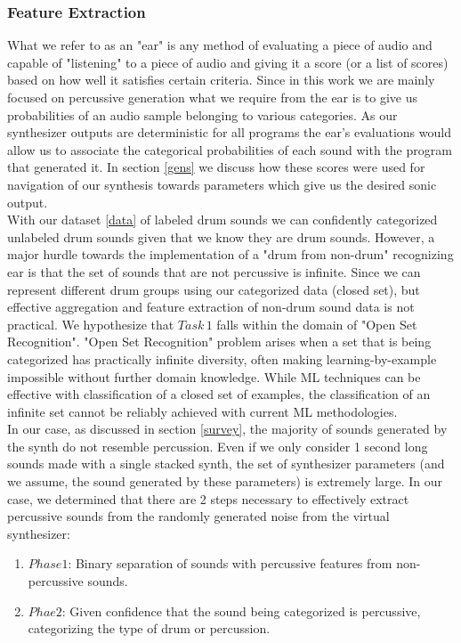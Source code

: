 \documentclass{nime-alternate} %
\begin{document}
\subsubsection{Feature Extraction}
What we refer to as an "ear" is any method of evaluating a piece of audio and capable of "listening" to a piece of audio and giving it a score (or a list of scores) based on how well it satisfies certain criteria. Since in this work we are mainly focused on percussive generation what we require from the ear is to give us probabilities of an audio sample belonging to various categories. As our synthesizer outputs are deterministic for all programs the ear's evaluations would allow us to associate the categorical probabilities of each sound with the program that generated it. In section \ref{gens} we discuss how these scores were used for navigation of our synthesis towards parameters which give us the desired sonic output.\\
 With our dataset \ref{data} of labeled drum sounds we can confidently categorized unlabeled drum sounds given that we know they are drum sounds. However, a major hurdle towards the implementation of a "drum from non-drum" recognizing ear is that the set of sounds that are not percussive is infinite. Since we can represent different drum groups using our categorized data (closed set), but effective aggregation and feature extraction of non-drum sound data is not practical. We hypothesize that $Task\,1$ falls within the domain of "Open Set Recognition"\cite{scheirer2012toward}. "Open Set Recognition" problem arises when a set that is being categorized has practically infinite diversity, often making learning-by-example impossible without further domain knowledge. While ML techniques can be effective with classification of a closed set of examples, the classification of an infinite set cannot be reliably achieved with current ML methodologies\cite{geng2018recent,mundt2019open}. \\
  In our case, as discussed in section \ref{survey}, the majority of sounds generated by the synth do not resemble percussion. Even if we only consider 1 second long sounds made with a single stacked synth, the set of synthesizer parameters (and we assume, the sound generated by these parameters) is extremely large. In our case, we determined that there are 2 steps necessary to effectively extract percussive sounds from the randomly generated noise from the virtual synthesizer: 
  \begin{enumerate}
   \item  $Phase1$: Binary separation of sounds with percussive features from non-percussive sounds.
   \item $Phae2$: Given confidence that the sound being categorized is percussive, categorizing the type of drum or percussion.
 \end{enumerate}
\end{document}

